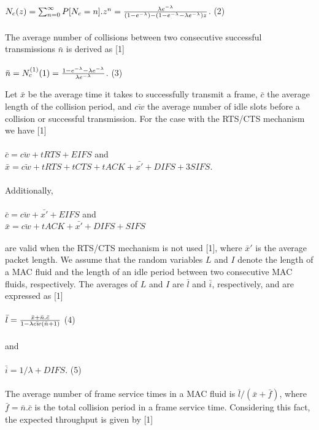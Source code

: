 \documentclass[10pt,twocolumn,oneside,submit]{JCNtran}
\begin{document}
\\
$N_c(z)=\sum_{n=0}^\infty P[N_c=n].z^n={\lambda e^{-\lambda }\over (1-e^{-\lambda })-(1-e^{-\lambda }-\lambda e^{-\lambda })z}$. \hfill(2) \\
\\
The average number of collisions between two consecutive successful transmissions $\bar n$ is derived as [1]\\
\\
$\bar n=N_c^{(1)}(1)={1-e^{-\lambda }-\lambda e^{-\lambda }\over\lambda e^{-\lambda }}$. \hfill(3) \\
\par Let $\bar x$ be the average time it takes to successfully transmit a frame, $\bar c$ the average length of the collision period, and $\bar {cw}$ the average number of idle slots before a collision or successful transmission. For the case with the RTS/CTS mechanism we have [1]\\
\\
$\bar c =\bar {cw} +tRTS+EIFS$ and\\
$\bar x =\bar {cw} +tRTS+tCTS+tACK+\bar {x'} +DIFS+3SIFS$.\\
\\
Additionally,\\
\\
$\bar c =\bar {cw} +\bar {x'} +EIFS$ and\\
$\bar x =\bar {cw}+tACK+\bar {x'}+DIFS+SIFS$\\
\\
are valid when the RTS/CTS mechanism is not used [1], where $\bar x'$ is the average packet length. We assume that the random variables $L$ and $I$ denote the length of a MAC fluid and the length of an idle period between two consecutive MAC fluids, respectively. The averages of $L$ and $I$ are $\bar l$ and $\bar i$, respectively, and are expressed as [1]\\
\\
$\bar l = {\bar x+\bar n.\bar c\over1-\lambda \bar {cw}(\bar n+1)}$ \hfill(4) \\
\\
and\\
\\
$\bar i = 1/\lambda + DIFS$. \hfill(5) \\
\\
The average number of frame service times in a MAC fluid is $\bar l/(\bar x+\bar f)$, where $\bar f=\bar n.\bar c$ is the total collision period in a frame service time. Considering this fact, the expected throughput is given by [1]\\
\end{document}
